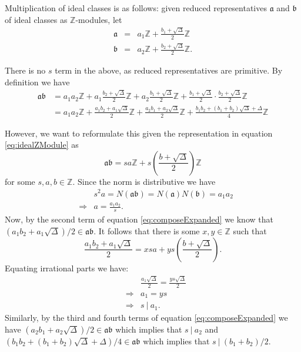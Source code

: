 \documentclass{ucalgthes1}
\theoremstyle{plain}
\theoremstyle{definition}
\newcommand{\ZZ}{\mathbb{Z}}
\begin{document}
Multiplication of ideal classes is as follows: given reduced representatives $\mathfrak{a}$ and $\mathfrak{b}$ of ideal classes as $\ZZ$-modules, let
\begin{eqnarray*}
	\mathfrak{a} & = & a_1 \ZZ + \frac{b_1 + \sqrt{\Delta}}{2} \ZZ \\
	\mathfrak{b} & = & a_2 \ZZ + \frac{b_2 + \sqrt{\Delta}}{2} \ZZ.
\end{eqnarray*}

There is no $s$ term in the above, as reduced representatives are primitive.  By definition we have
\begin{equation}
\begin{split}
	\mathfrak{a} \mathfrak{b} & = a_1a_2 \ZZ + a_1 \frac{b_2 + \sqrt{\Delta}}{2} \ZZ + a_2 \frac{b_1 + \sqrt{\Delta}}{2} \ZZ + \frac{b_1 + \sqrt{\Delta}}{2} \cdot \frac{b_2 + \sqrt{\Delta}}{2} \ZZ \\
	& = a_1a_2 \ZZ + \frac{a_1b_2 + a_1\sqrt{\Delta}}{2} \ZZ + \frac{a_2b_1 + a_2\sqrt{\Delta}}{2} \ZZ + \frac{b_1b_2 + (b_1+b_2)\sqrt{\Delta} + \Delta}{4} \ZZ \label{eq:composeExpanded}
\end{split}
\end{equation}

\noindent
However, we want to reformulate this given the representation in equation \eqref{eq:idealZModule} as
\[
	\mathfrak{a} \mathfrak{b} = sa \ZZ + s \left(\frac{b + \sqrt{\Delta}}{2}\right) \ZZ
\]
for some $s, a, b \in \ZZ$.  Since the norm is distributive we have
\begin{eqnarray*}
	&& s^2a = N(\mathfrak{a}\mathfrak{b}) = N(\mathfrak{a})N(\mathfrak{b}) = a_1 a_2 \\
	& \Rightarrow & a = \frac{a_1a_2}{s}.
\end{eqnarray*}
Now, by the second term of equation \eqref{eq:composeExpanded} we know that $(a_1b_2 + a_1\sqrt{\Delta})/2 \in \mathfrak{a}\mathfrak{b}$.  It follows that there is some $x,y \in \ZZ$ such that
\[
	\frac{a_1b_2 + a_1\sqrt{\Delta}}{2} = xsa + ys\left(\frac{b+\sqrt{\Delta}}{2}\right).
\]
Equating irrational parts we have:
\begin{eqnarray*}
	&& \frac{a_1\sqrt{\Delta}}{2} = \frac{ys\sqrt{\Delta}}{2} \\
	& \Rightarrow & a_1 = ys \\
	& \Rightarrow & s~|~a_1.
\end{eqnarray*}
\noindent
Similarly, by the third and fourth terms of equation \eqref{eq:composeExpanded} we have $(a_2b_1+a_2\sqrt{\Delta})/2 \in \mathfrak{a}\mathfrak{b}$ which implies that $s~|~a_2$ and $(b_1b_2 + (b_1+b_2)\sqrt{\Delta} + \Delta)/4 \in \mathfrak{a}\mathfrak{b}$ which implies that \break $s~|~(b_1+b_2)/2$. 
\end{document}
